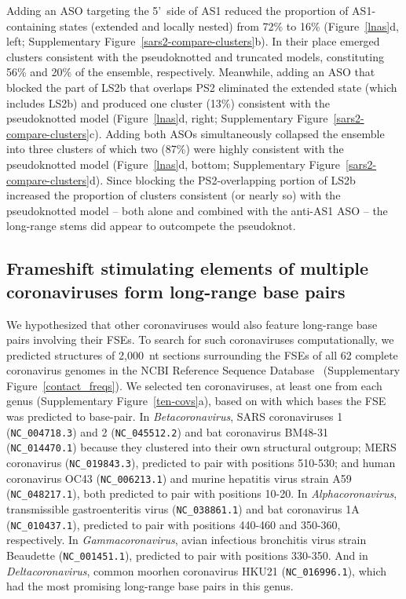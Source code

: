 \documentclass[main.tex]{subfiles}
\begin{document}
Adding an ASO targeting the 5'~side of AS1 reduced the proportion of AS1-containing states (extended and locally nested) from 72\% to 16\% (Figure~\ref{lnas}d, left; Supplementary Figure~\ref{sars2-compare-clusters}b).
In their place emerged clusters consistent with the pseudoknotted and truncated models, constituting 56\% and 20\% of the ensemble, respectively.
Meanwhile, adding an ASO that blocked the part of LS2b that overlaps PS2 eliminated the extended state (which includes LS2b) and produced one cluster (13\%) consistent with the pseudoknotted model (Figure~\ref{lnas}d, right; Supplementary Figure~\ref{sars2-compare-clusters}c).
Adding both ASOs simultaneously collapsed the ensemble into three clusters of which two (87\%) were highly consistent with the pseudoknotted model (Figure~\ref{lnas}d, bottom; Supplementary Figure~\ref{sars2-compare-clusters}d).
Since blocking the PS2-overlapping portion of LS2b increased the proportion of clusters consistent (or nearly so) with the pseudoknotted model -- both alone and combined with the anti-AS1 ASO -- the long-range stems did appear to outcompete the pseudoknot.

\subsection{Frameshift stimulating elements of multiple coronaviruses form long-range base pairs}

We hypothesized that other coronaviruses would also feature long-range base pairs involving their FSEs.
To search for such coronaviruses computationally, we predicted structures of 2,000~nt sections surrounding the FSEs of all 62 complete coronavirus genomes in the NCBI Reference Sequence Database~\cite{OLeary2016} (Supplementary Figure~\ref{contact_freqs}).
We selected ten coronaviruses, at least one from each genus (Supplementary Figure~\ref{ten-covs}a), based on with which bases the FSE was predicted to base-pair.
In \textit{Betacoronavirus}, SARS coronaviruses 1 (\verb|NC_004718.3|) and 2 (\verb|NC_045512.2|) and bat coronavirus BM48-31 (\verb|NC_014470.1|) because they clustered into their own structural outgroup; MERS coronavirus (\verb|NC_019843.3|), predicted to pair with positions 510-530; and human coronavirus OC43 (\verb|NC_006213.1|) and murine hepatitis virus strain A59 (\verb|NC_048217.1|), both predicted to pair with positions 10-20.
In \textit{Alphacoronavirus}, transmissible gastroenteritis virus (\verb|NC_038861.1|) and bat coronavirus 1A (\verb|NC_010437.1|), predicted to pair with positions 440-460 and 350-360, respectively.
In \textit{Gammacoronavirus}, avian infectious bronchitis virus strain Beaudette (\verb|NC_001451.1|), predicted to pair with positions 330-350.
And in \textit{Deltacoronavirus}, common moorhen coronavirus HKU21 (\verb|NC_016996.1|), which had the most promising long-range base pairs in this genus.
\end{document}
